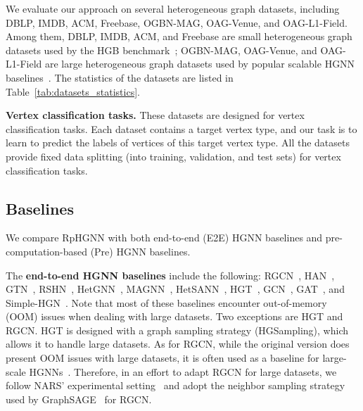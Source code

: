 \documentclass[lettersize,journal]{IEEEtran}
\begin{document}
We evaluate our approach on several heterogeneous graph datasets, including DBLP, IMDB, ACM, Freebase, OGBN-MAG, OAG-Venue, and OAG-L1-Field.
Among them, DBLP, IMDB, ACM, and Freebase are small heterogeneous graph datasets used by the HGB benchmark~\cite{DBLP:conf/kdd/LvDLCFHZJDT21}; OGBN-MAG, OAG-Venue, and OAG-L1-Field are large heterogeneous graph datasets used by popular scalable HGNN baselines~\cite{yu2020scalable,yang2022simple}.
The statistics of the datasets are listed in Table~\ref{tab:datasets_statistics}.


\textbf{Vertex classification tasks.}
These datasets are designed for vertex classification tasks.
Each dataset contains a target vertex type, and our task is to learn to predict the labels of vertices of this target vertex type.
All the datasets provide fixed data splitting (into training, validation, and test sets) for vertex classification tasks.









\subsection{Baselines}

We compare RpHGNN with both end-to-end (E2E) HGNN baselines and pre-computation-based (Pre) HGNN baselines.

The \textbf{end-to-end HGNN baselines} include the following: RGCN~\cite{DBLP:conf/esws/SchlichtkrullKB18}, HAN~\cite{DBLP:conf/www/WangJSWYCY19}, GTN~\cite{DBLP:conf/nips/YunJKKK19}, RSHN~\cite{DBLP:conf/icdm/ZhuZPZW19}, HetGNN~\cite{DBLP:conf/kdd/ZhangSHSC19}, MAGNN~\cite{DBLP:conf/www/0004ZMK20}, HetSANN~\cite{DBLP:conf/aaai/HongGLYLY20}, HGT~\cite{DBLP:conf/www/HuDWS20}, GCN~\cite{DBLP:conf/iclr/KipfW17}, GAT~\cite{DBLP:conf/iclr/VelickovicCCRLB18}, and Simple-HGN~\cite{DBLP:conf/kdd/LvDLCFHZJDT21}.
Note that most of these baselines encounter out-of-memory (OOM) issues when dealing with large datasets.
Two exceptions are HGT and RGCN.
HGT is designed with a graph sampling strategy (HGSampling), which allows it to handle large datasets.
As for RGCN, while the original version does present OOM issues with large datasets, it is often used as a baseline for large-scale HGNNs~\cite{yu2020scalable}.
Therefore, in an effort to adapt RGCN for large datasets, we follow NARS' experimental setting~\cite{yu2020scalable} and adopt the neighbor sampling strategy used by GraphSAGE~\cite{DBLP:conf/nips/HamiltonYL17} for RGCN.
\end{document}
